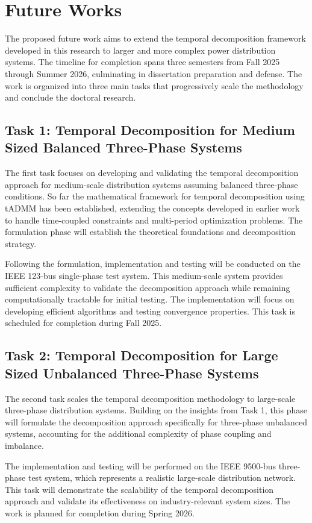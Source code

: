\clearpage
\section{Future Works}
\label{sec:future_Work}
The proposed future work aims to extend the temporal decomposition framework developed in this research to larger and more complex power distribution systems. The timeline for completion spans three semesters from Fall 2025 through Summer 2026, culminating in dissertation preparation and defense. The work is organized into three main tasks that progressively scale the methodology and conclude the doctoral research.

\subsection{Task 1: Temporal Decomposition for Medium Sized Balanced Three-Phase Systems}
The first task focuses on developing and validating the temporal decomposition approach for medium-scale distribution systems assuming balanced three-phase conditions. So far the mathematical framework for temporal decomposition using tADMM has been established, extending the concepts developed in earlier work to handle time-coupled constraints and multi-period optimization problems. The formulation phase will establish the theoretical foundations and decomposition strategy.

Following the formulation, implementation and testing will be conducted on the IEEE 123-bus single-phase test system. This medium-scale system provides sufficient complexity to validate the decomposition approach while remaining computationally tractable for initial testing. The implementation will focus on developing efficient algorithms and testing convergence properties. This task is scheduled for completion during Fall 2025.

\subsection{Task 2: Temporal Decomposition for Large Sized Unbalanced Three-Phase Systems}
The second task scales the temporal decomposition methodology to large-scale three-phase distribution systems. Building on the insights from Task 1, this phase will formulate the decomposition approach specifically for three-phase unbalanced systems, accounting for the additional complexity of phase coupling and imbalance.

The implementation and testing will be performed on the IEEE 9500-bus three-phase test system, which represents a realistic large-scale distribution network. This task will demonstrate the scalability of the temporal decomposition approach and validate its effectiveness on industry-relevant system sizes. The work is planned for completion during Spring 2026.

